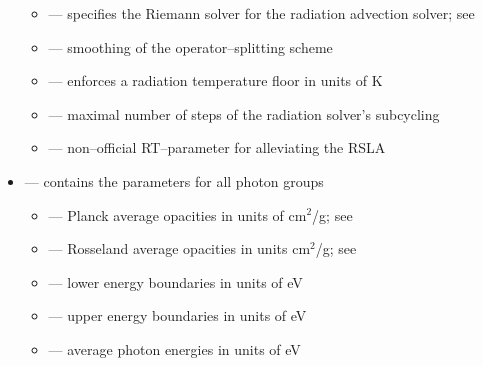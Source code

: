 \begin{itemize}
\begin{itemize}
    \item {} --- specifies the Riemann solver for the radiation advection solver; see \\[-9pt]
    \item {} --- smoothing of the operator--splitting scheme\\[-9pt]
    \item {} --- enforces a radiation temperature floor in units of K\\[-9pt]
    \item {} --- maximal number of steps of the radiation solver's subcycling\\[-9pt]
    \item {} --- non--official RT--parameter for alleviating the RSLA\\[-3pt]
  \end{itemize}
  \item {} \quad --- contains the parameters for all photon groups\\[-9pt]
  \begin{itemize}
    \item {} --- Planck average opacities in units of cm$^{2}$/g; see \citet{Davisetal}\\[-9pt]
    \item {} --- Rosseland average opacities in units cm$^{2}$/g; see \citet{Davisetal}\\[-9pt]
    \item {} --- lower energy boundaries in units of eV\\[-9pt]
    \item {} --- upper energy boundaries in units of eV\\[-9pt]
    \item {} --- average photon energies in units of eV\\[-3pt]
  \end{itemize}
\end{itemize}
